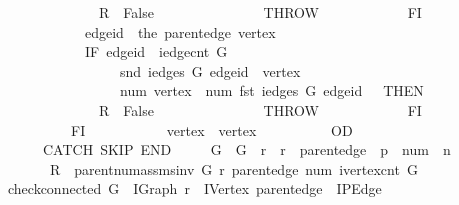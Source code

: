 \begin{isabellebody}
\ \ \ \ \ \ \ \ \ \ \ \ \ \ {\isasymacute}R\ {\isacharcolon}{\isacharequal}{\isacharequal}\ False\ {\isacharsemicolon}{\isacharsemicolon}\isanewline
\ \ \ \ \ \ \ \ \ \ \ \ \ \ THROW\isanewline
\ \ \ \ \ \ \ \ \ \ \ \ FI\ {\isacharsemicolon}{\isacharsemicolon}\isanewline
\ \ \ \ \ \ \ \ \ \ \ \ {\isasymacute}edge{\isacharunderscore}id\ {\isacharcolon}{\isacharequal}{\isacharequal}\ the\ {\isacharparenleft}{\isasymacute}parent{\isacharunderscore}edge\ {\isasymacute}vertex{\isacharparenright}\ {\isacharsemicolon}{\isacharsemicolon}\isanewline
\ \ \ \ \ \ \ \ \ \ \ \ IF\ {\isasymacute}edge{\isacharunderscore}id\ {\isasymge}\ iedge{\isacharunderscore}cnt\ {\isasymacute}G\isanewline
\ \ \ \ \ \ \ \ \ \ \ \ \ \ \ \ {\isasymor}\ snd\ {\isacharparenleft}iedges\ {\isasymacute}G\ {\isasymacute}edge{\isacharunderscore}id{\isacharparenright}\ {\isasymnoteq}\ {\isasymacute}vertex\isanewline
\ \ \ \ \ \ \ \ \ \ \ \ \ \ \ \ {\isasymor}\ {\isasymacute}num\ {\isasymacute}vertex\ {\isasymnoteq}\ {\isasymacute}num\ {\isacharparenleft}fst\ {\isacharparenleft}iedges\ {\isasymacute}G\ {\isasymacute}edge{\isacharunderscore}id{\isacharparenright}{\isacharparenright}\ {\isacharplus}\ {}\ THEN\isanewline
\ \ \ \ \ \ \ \ \ \ \ \ \ \ {\isasymacute}R\ {\isacharcolon}{\isacharequal}{\isacharequal}\ False\ {\isacharsemicolon}{\isacharsemicolon}\isanewline
\ \ \ \ \ \ \ \ \ \ \ \ \ \ THROW\isanewline
\ \ \ \ \ \ \ \ \ \ \ \ FI\isanewline
\ \ \ \ \ \ \ \ \ \ FI\ {\isacharsemicolon}{\isacharsemicolon}\isanewline
\ \ \ \ \ \ \ \ \ \ {\isasymacute}vertex\ {\isacharcolon}{\isacharequal}{\isacharequal}\ {\isasymacute}vertex\ {\isacharplus}\ {}\isanewline
\ \ \ \ \ \ \ \ OD\isanewline
\ \ \ \ \ \ CATCH\ SKIP\ END\isanewline
\ \ \ \ {\isasymlbrace}\ {\isasymacute}G\ {\isacharequal}\ G\ {\isasymand}\ {\isasymacute}r\ {\isacharequal}\ r\ {\isasymand}\ {\isasymacute}parent{\isacharunderscore}edge\ {\isacharequal}\ p\ {\isasymand}\ {\isasymacute}num\ {\isacharequal}\ n\isanewline
\ \ \ \ \ \ {\isasymand}\ {\isasymacute}R\ {\isacharequal}\ parent{\isacharunderscore}num{\isacharunderscore}assms{\isacharunderscore}inv\ {\isasymacute}G\ {\isasymacute}r\ {\isasymacute}parent{\isacharunderscore}edge\ {\isasymacute}num\ {\isacharparenleft}ivertex{\isacharunderscore}cnt\ {\isasymacute}G{\isacharparenright}{\isasymrbrace}{\isachardoublequoteclose}\isanewline
\isanewline
{}\isamarkupfalse%
\ check{\isacharunderscore}connected\ {\isacharparenleft}G\ {\isacharcolon}{\isacharcolon}\ IGraph{\isacharcomma}\ r\ {\isacharcolon}{\isacharcolon}\ IVertex{\isacharcomma}\ parent{\isacharunderscore}edge\ {\isacharcolon}{\isacharcolon}\ IPEdge{\isacharcomma}\isanewline

\end{isabellebody}
